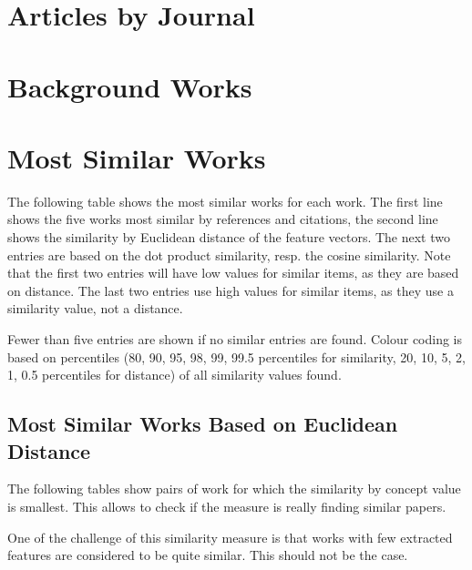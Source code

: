 \documentclass[a4paper]{article}
\begin{document}


\clearpage
\section{Articles by Journal}



\clearpage
\section{Background Works}



\clearpage
\section{Most Similar Works}

The following table shows the most similar works for each work. The first line shows the five works most similar by references and citations, the second line shows the similarity by Euclidean distance of the feature vectors. The next two entries are based on the dot product similarity, resp. the cosine similarity. Note that the first two entries will have low values for similar items, as they are based on distance. The last two entries use high values for similar items, as they use a similarity value, not a distance.

Fewer than five entries are shown if no similar entries are found. Colour coding is based on percentiles (80, 90, 95, 98, 99, 99.5 percentiles for similarity, 20, 10, 5, 2, 1, 0.5 percentiles for distance) of all similarity values found.



\clearpage
\subsection{Most Similar Works Based on Euclidean Distance}

The following tables show pairs of work for which the similarity by concept value is smallest. This allows to check if the measure is really finding similar papers.

One of the challenge of this similarity measure is that works with few extracted features are considered to be quite similar. This should not be the case.




\end{document}
